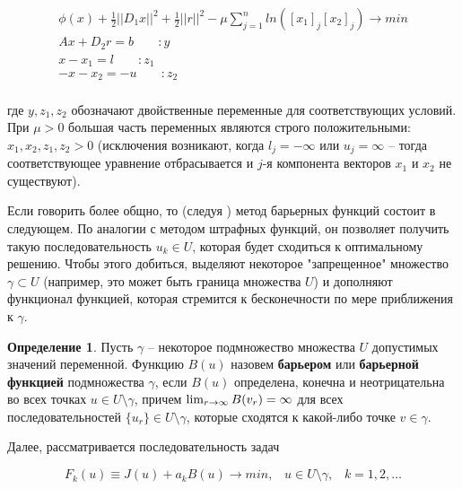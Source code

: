 \documentclass[a4paper, 12pt, titlepage]{article}
\theoremstyle{definition}
\newtheorem{SmartDefinition}{Определение}
\theoremstyle{plain}
\theoremstyle{plain}
\begin{document}
\begin{equation}
 \label{eq:co-mu}
 \begin{aligned}
  \phi(x) + \frac{1}{2}||D_{1} x||^{2} + \frac{1}{2}||r||^{2} -
  \mu \sum \limits_{j = 1}^{n} ln([x_{1}]_{j} [x_{2}]_{j}) \to min \\
  A x + D_{2} r = b \;\;\;\;\;\;\; : y\\
  x - x_{1} = l \;\;\;\;\;\;\; : z_{1}\\
  -x - x_{2} = -u \;\;\;\;\;\;\; : z_{2}\\
 \end{aligned}
\end{equation}

где $y, z_{1}, z_{2}$ обозначают двойственные переменные для соответствующих
условий. При $\mu > 0$ большая часть переменных являются строго положительными:
$x_{1}, x_{2}, z_{1}, z_{2} > 0$ (исключения возникают, когда $l_{j} = -\infty$
или $u_{j} = \infty$ -- тогда соответствующее уравнение отбрасывается и
$j$-я компонента векторов $x_{1}$ и $x_{2}$ не существуют).

Если говорить более общно, то (следуя \cite{Vasilev1980}) метод барьерных
функций состоит в следующем. По аналогии с методом штрафных функций, он
позволяет получить такую последовательность $u_{k} \in U$, которая будет
сходиться к оптимальному решению. Чтобы этого добиться, выделяют некоторое
"запрещенное" множество $\gamma \subset U$ (например, это может быть граница
множества $U$) и дополняют функционал функцией, которая стремится к
бесконечности по мере приближения к $\gamma$.

\begin{SmartDefinition}
 Пусть $\gamma$ -- некоторое подмножество множества $U$ допустимых значений
 переменной. Функцию $B(u)$ назовем \textbf{барьером} или \textbf{барьерной
 функцией} подмножества $\gamma$, если $B(u)$ определена, конечна и 
 неотрицательна во всех точках $u \in U \setminus \gamma$, причем
 $\operatornamewithlimits{lim}_{r \to \infty} B(v_{r}) = \infty$ для всех
 последовательностей $\{u_{r}\} \in U \setminus \gamma$, которые сходятся к
 какой-либо точке $v \in \gamma$.
\end{SmartDefinition}

Далее, рассматривается последовательность задач

\begin{equation}
 F_{k}(u) \equiv J(u) + a_{k} B(u) \to min, \;\;\; u \in U \setminus \gamma, 
\;\;\;
 k = 1, 2, \ldots
\end{equation}
\end{document}
